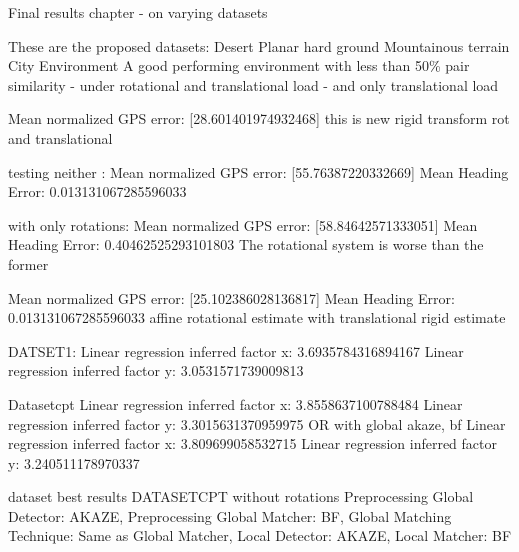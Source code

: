 

Final results chapter - on varying datasets

These are the proposed datasets: 
Desert 
Planar hard ground
Mountainous terrain
City Environment 
A good performing environment with less than 50\% pair similarity - under rotational and translational load - and only translational load




Mean normalized GPS error: [28.601401974932468]
this is new rigid transform rot and translational

testing neither :
Mean normalized GPS error: [55.76387220332669]
Mean Heading Error: 0.013131067285596033

with only rotations:
Mean normalized GPS error: [58.84642571333051]
Mean Heading Error: 0.40462525293101803
The rotational system is worse than the former

Mean normalized GPS error: [25.102386028136817]
Mean Heading Error: 0.013131067285596033
affine rotational estimate with translational rigid estimate 



DATSET1:
Linear regression inferred factor x: 3.6935784316894167
Linear regression inferred factor y: 3.0531571739009813

Datasetcpt
Linear regression inferred factor x: 3.8558637100788484
Linear regression inferred factor y: 3.3015631370959975
OR with global akaze, bf
Linear regression inferred factor x: 3.809699058532715
Linear regression inferred factor y: 3.240511178970337



dataset best results 
DATASETCPT without rotations
Preprocessing Global Detector: AKAZE, Preprocessing Global Matcher: BF, Global Matching Technique: Same as Global Matcher, Local Detector: AKAZE, Local Matcher: BF
